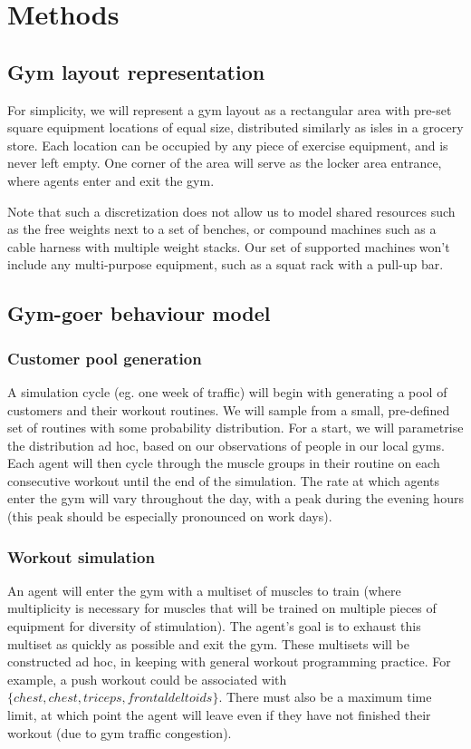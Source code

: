 \documentclass[9pt]{pnas-new}
\begin{document}
\section*{Methods}

\subsection*{Gym layout representation}
For simplicity, we will represent a gym layout as a rectangular area with pre-set square equipment locations of equal size, distributed similarly as isles in a grocery store.
Each location can be occupied by any piece of exercise equipment, and is never left empty.
One corner of the area will serve as the locker area entrance, where agents enter and exit the gym.

Note that such a discretization does not allow us to model shared resources such as the free weights next to a set of benches, or compound machines such as a cable harness with multiple weight stacks.
Our set of supported machines won't include any multi-purpose equipment, such as a squat rack with a pull-up bar.

\subsection*{Gym-goer behaviour model}

\subsubsection*{Customer pool generation}
A simulation cycle (eg. one week of traffic) will begin with generating a pool of customers and their workout routines. We will sample from a small, pre-defined set of routines with some probability distribution. For a start, we will parametrise the distribution ad hoc, based on our observations of people in our local gyms.
Each agent will then cycle through the muscle groups in their routine on each consecutive workout until the end of the simulation.
The rate at which agents enter the gym will vary throughout the day, with a peak during the evening hours (this peak should be especially pronounced on work days).

\subsubsection*{Workout simulation}
An agent will enter the gym with a multiset of muscles to train (where multiplicity is necessary for muscles that will be trained on multiple pieces of equipment for diversity of stimulation). The agent's goal is to exhaust this multiset as quickly as possible and exit the gym.
These multisets will be constructed ad hoc, in keeping with general workout programming practice. For example, a push workout could be associated with $\{chest, chest, triceps, frontal deltoids\}$.
There must also be a maximum time limit, at which point the agent will leave even if they have not finished their workout (due to gym traffic congestion).
\end{document}
